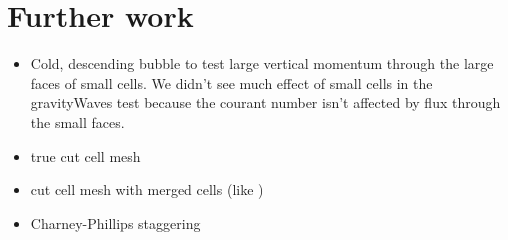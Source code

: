 \chapter{Further work}

\begin{itemize}
\item Cold, descending bubble to test large vertical momentum through the large faces of small cells.  We didn't see much effect of small cells in the gravityWaves test because the courant number isn't affected by flux through the small faces.
\item true cut cell mesh
\item cut cell mesh with merged cells (like \textcite{yamazaki-satomura2010})
\item Charney-Phillips staggering
\end{itemize}
